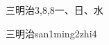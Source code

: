 \begin{entry}{三明治}{3,8,8}{⼀、⽇、⽔}
  \begin{phonetics}{三明治}{san1ming2zhi4}
  \end{phonetics}
\end{entry}
